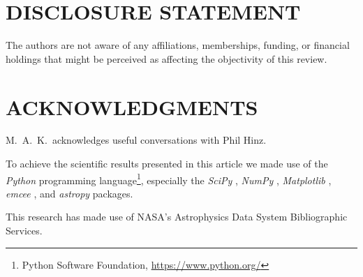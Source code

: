 \documentclass[letterpaper]{ar-1col}
\begin{document}
\section*{DISCLOSURE STATEMENT}
The authors are not aware of any affiliations, memberships, funding, or financial holdings that
might be perceived as affecting the objectivity of this review.

\section*{ACKNOWLEDGMENTS}
M.\ A.\ K.\ acknowledges useful conversations with
Phil Hinz.


To achieve the scientific results presented in this article we made use of the \emph{Python} programming language\footnote{Python Software Foundation, \url{https://www.python.org/}}, especially the \emph{SciPy} \citep{virtanen2020}, \emph{NumPy} \citep{numpy}, \emph{Matplotlib} \citep{Matplotlib}, \emph{emcee} \citep{foreman-mackey2013}, and \emph{astropy} \citep{astropy_1,astropy_2} packages.
%

This research has made use of NASA's Astrophysics Data System Bibliographic Services.





\end{document}

